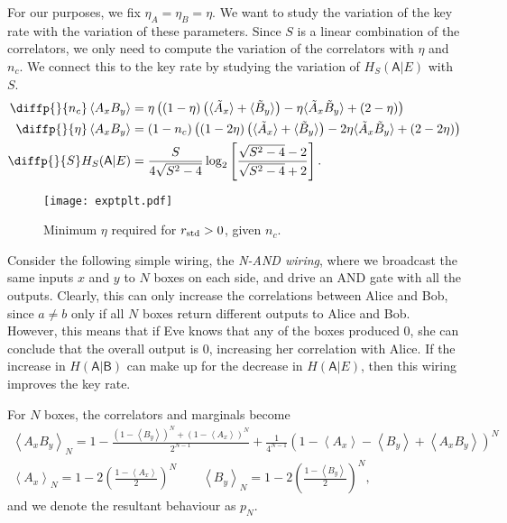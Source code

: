 \documentclass[10pt, a4paper]{article}
\numberwithin{equation}{section} %
\theoremstyle{definition}
\theoremstyle{plain}
\newcommand{\?}{\mathrel{?}} %
\newcommand{\angleb}[1]{\left\langle #1 \right\rangle} %
\newcommand{\crv}[1]{\mathsf{#1}}
\newcommand{\std}{\rm std}
\begin{document}
      For our purposes, we fix \(\eta_A = \eta_B = \eta\). We want to study the variation of the key rate with the variation of these parameters. Since \(S\) is a linear combination of the correlators, we only need to compute the variation of the correlators with \(\eta\) and \(n_c\). We connect this to the key rate by studying the variation of \(H_S(\crv{A}|E)\) with \(S\).
      \begin{align*}
        \diffp{}{{n_c}} \angleb{A_x B_y} &= \eta \left( \left(1-\eta\right) \left(\langle\tilde{A}_x\rangle + \langle\tilde{B}_y\rangle\right) - \eta \langle\tilde{A}_x\tilde{B}_y\rangle + \left(2 - \eta\right) \right) \\
        \diffp{}{{\eta}} \angleb{A_x B_y} &= \left(1 - n_{c}\right) \left( \left(1-2\eta\right) \left(\langle\tilde{A}_x\rangle+\langle\tilde{B}_y\rangle\right) - 2\eta \langle\tilde{A}_x\tilde{B}_y\rangle + (2-2\eta) \right) \\
        \diffp{}{S} H_S(\crv{A}|E) &= \frac{S}{4\sqrt{S^2-4}} \log_2 \left[ \frac{\sqrt{S^2-4}-2}{\sqrt{S^2-4}+2} \right].
      \end{align*}

    \begin{figure}
      \centering
      \texttt{[image: exptplt.pdf]}
      \caption{\label{fig:exptplt} Minimum \(\eta\) required for \(r_{\std} > 0\), given \(n_c\).}
    \end{figure}

      Consider the following simple wiring, the \emph{N-AND wiring}, where we broadcast the same inputs \(x\) and \(y\) to \(N\) boxes on each side, and drive an AND gate with all the outputs. Clearly, this can only increase the correlations between Alice and Bob, since \(a \neq b\) only if all \(N\) boxes return different outputs to Alice and Bob. However, this means that if Eve knows that any of the boxes produced 0, she can conclude that the overall output is 0, increasing her correlation with Alice. If the increase in \(H(\crv{A}|\crv{B})\) can make up for the decrease in \(H(\crv{A}|E)\), then this wiring improves the key rate.

      For \(N\) boxes, the correlators and marginals become
      \begin{gather}
        \angleb{A_x B_y}_{N} = 1 - \frac{{(1-\angleb{B_y})}^N + {(1-\angleb{A_x})}^N}{2^{N-1}} + \frac{1}{4^{N-1}} {(1-\angleb{A_x} - \angleb{B_y} + \angleb{A_x B_y})}^{N} \\
        \angleb{A_x}_{N} = 1 - 2 {\left(\frac{1-\angleb{A_x}}{2}\right)}^N \qquad \angleb{B_y}_{N} = 1 - 2 {\left(\frac{1-\angleb{B_y}}{2}\right)}^N,
      \end{gather}
      and we denote the resultant behaviour as \(p_N\).
\end{document}
